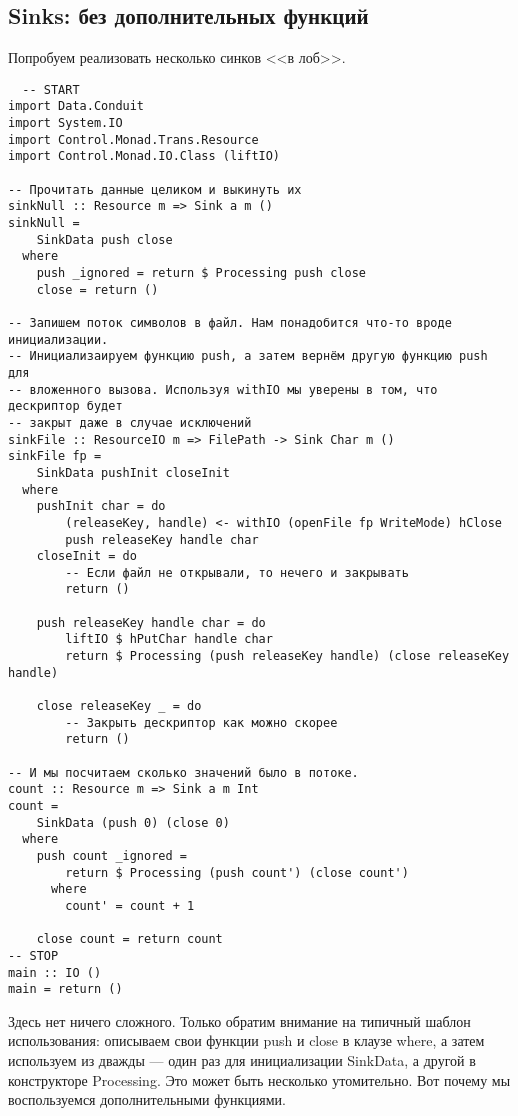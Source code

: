 \subsection{Sinks: без дополнительных функций}
Попробуем реализовать несколько синков <<в лоб>>.
\begin{lstlisting}
  -- START
import Data.Conduit
import System.IO
import Control.Monad.Trans.Resource
import Control.Monad.IO.Class (liftIO)

-- Прочитать данные целиком и выкинуть их
sinkNull :: Resource m => Sink a m ()
sinkNull =
    SinkData push close
  where
    push _ignored = return $ Processing push close
    close = return ()

-- Запишем поток символов в файл. Нам понадобится что-то вроде инициализации.
-- Инициализаируем функцию push, а затем вернём другую функцию push для 
-- вложенного вызова. Используя withIO мы уверены в том, что дескриптор будет 
-- закрыт даже в случае исключений
sinkFile :: ResourceIO m => FilePath -> Sink Char m ()
sinkFile fp =
    SinkData pushInit closeInit
  where
    pushInit char = do
        (releaseKey, handle) <- withIO (openFile fp WriteMode) hClose
        push releaseKey handle char
    closeInit = do
        -- Если файл не открывали, то нечего и закрывать
        return ()

    push releaseKey handle char = do
        liftIO $ hPutChar handle char
        return $ Processing (push releaseKey handle) (close releaseKey handle)

    close releaseKey _ = do
        -- Закрыть дескриптор как можно скорее
        return ()

-- И мы посчитаем сколько значений было в потоке.
count :: Resource m => Sink a m Int
count =
    SinkData (push 0) (close 0)
  where
    push count _ignored =
        return $ Processing (push count') (close count')
      where
        count' = count + 1

    close count = return count
-- STOP
main :: IO ()
main = return ()
\end{lstlisting}
Здесь нет ничего сложного. Только обратим внимание на типичный шаблон использования:
описываем свои функции push и close в клаузе where, а затем используем из дважды --- 
один раз для инициализации SinkData, а другой в конструкторе Processing. 
Это может быть несколько утомительно. Вот почему мы воспользуемся дополнительными функциями.


